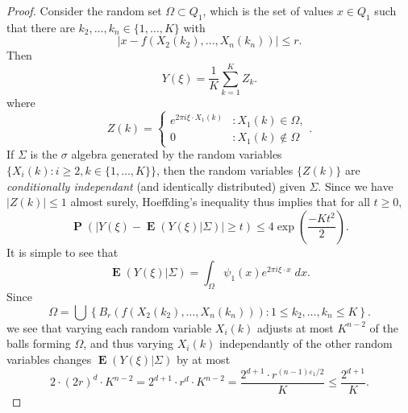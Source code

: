 \documentclass[12pt,reqno]{article}
\numberwithin{equation}{section}
\numberwithin{theorem}{section}
\DeclareMathOperator{\EE}{\mathbf{E}}
\DeclareMathOperator{\PP}{\mathbf{P}}
\begin{document}
\begin{proof}
    Consider the random set $\Omega \subset Q_1$, which is the set of values $x \in Q_1$ such that there are $k_2,\dots,k_n \in \{ 1,\dots,K \}$ with
    \begin{equation}
        |x - f(X_2(k_2),\dots,X_n(k_n))| \leq r.
    \end{equation}
    Then
    \begin{equation}
        Y(\xi) = \frac{1}{K} \sum_{k = 1}^K Z_k.
    \end{equation}
    where
    \begin{equation}
        Z(k) = \begin{cases} e^{2 \pi i \xi \cdot X_1(k)} &: X_1(k) \in \Omega, \\ 0 &: X_1(k) \not \in \Omega \end{cases}.
    \end{equation}
    If $\Sigma$ is the $\sigma$ algebra generated by the random variables $\{ X_i(k) : i \geq 2, k \in \{ 1, \dots, K \} \}$, then the random variables $\{ Z(k) \}$ are \emph{conditionally independant} (and identically distributed) given $\Sigma$. Since we have $|Z(k)| \leq 1$ almost surely, Hoeffding's inequality thus implies that for all $t \geq 0$,
    \begin{equation} \label{equationCOIJCOIJX1232312}
        \PP \left( \left| Y(\xi) - \EE(Y(\xi)|\Sigma) \right| \geq t \right) \leq 4 \exp \left( \frac{-K t^2}{2} \right).
    \end{equation}
    It is simple to see that
    \begin{equation}
        \EE(Y(\xi) | \Sigma) = \int_\Omega \psi_1(x) e^{2 \pi i \xi \cdot x}\; dx.
    \end{equation}
    Since
    \begin{equation}
        \Omega = \bigcup \left\{ B_r(f(X_2(k_2),\dots,X_n(k_n))) : 1 \leq k_2,\dots,k_n \leq K \right\}.
    \end{equation}
    we see that varying each random variable $X_i(k)$ adjusts at most $K^{n-2}$ of the balls forming $\Omega$, and thus varying $X_i(k)$ independantly of the other random variables changes $\EE(Y(\xi)|\Sigma)$ by at most
    \begin{equation}
        2 \cdot (2r)^d \cdot K^{n-2} = 2^{d+1} \cdot r^d \cdot K^{n-2} = \frac{2^{d+1} \cdot r^{(n-1) \varepsilon_1/2}}{K} \leq \frac{2^{d+1}}{K}.
    \end{equation}

\end{proof}
\end{document}
